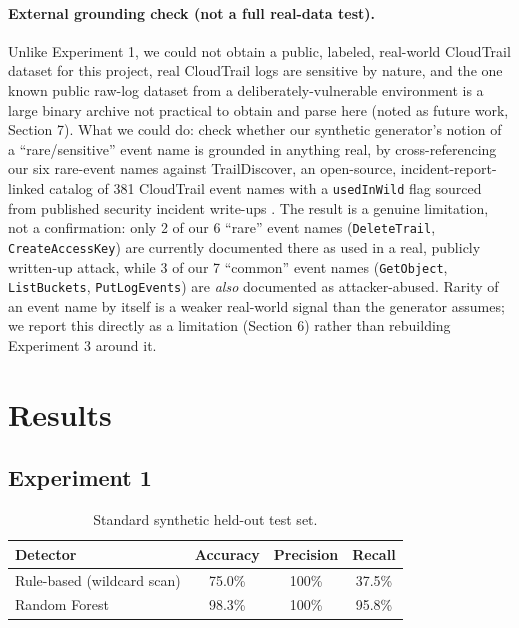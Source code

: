 \documentclass[11pt,a4paper]{article}
\begin{document}
\paragraph{External grounding check (not a full real-data test).} Unlike Experiment 1, we could not obtain a public, labeled, real-world CloudTrail dataset for this project, real CloudTrail logs are sensitive by nature, and the one known public raw-log dataset from a deliberately-vulnerable environment is a large binary archive not practical to obtain and parse here (noted as future work, Section 7). What we could do: check whether our synthetic generator's notion of a ``rare/sensitive'' event name is grounded in anything real, by cross-referencing our six rare-event names against TrailDiscover, an open-source, incident-report-linked catalog of 381 CloudTrail event names with a \texttt{usedInWild} flag sourced from published security incident write-ups \cite{traildiscover}. The result is a genuine limitation, not a confirmation: only 2 of our 6 ``rare'' event names (\texttt{DeleteTrail}, \texttt{CreateAccessKey}) are currently documented there as used in a real, publicly written-up attack, while 3 of our 7 ``common'' event names (\texttt{GetObject}, \texttt{ListBuckets}, \texttt{PutLogEvents}) are \emph{also} documented as attacker-abused. Rarity of an event name by itself is a weaker real-world signal than the generator assumes; we report this directly as a limitation (Section 6) rather than rebuilding Experiment 3 around it.

\section{Results}

\subsection{Experiment 1}

\begin{table}[h]
\centering
\begin{tabular}{@{}lccc@{}}
\toprule
Detector & Accuracy & Precision & Recall \\
\midrule
Rule-based (wildcard scan) & 75.0\% & 100\% & 37.5\% \\
Random Forest & 98.3\% & 100\% & 95.8\% \\
\bottomrule
\end{tabular}
\caption{Standard synthetic held-out test set.}
\end{table}
\end{document}
